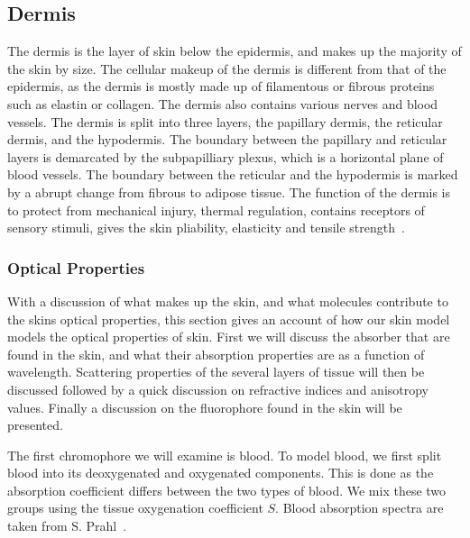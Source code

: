 \subsection*{Dermis} %
\label{sub:dermis}
The dermis is the layer of skin below the epidermis, and makes up the majority of the skin by size.
The cellular makeup of the dermis is different from that of the epidermis, as the dermis is mostly made up of filamentous or fibrous proteins such as elastin or collagen.
The dermis also contains various nerves and blood vessels.
The dermis is split into three layers, the papillary dermis, the reticular dermis, and the hypodermis.
The boundary between the papillary and reticular layers is demarcated by the subpapilliary plexus, which is a horizontal plane of blood vessels.
The boundary between the reticular and the hypodermis is marked by a abrupt change from fibrous to adipose tissue.
The function of the dermis is to protect from mechanical injury, thermal regulation, contains receptors of sensory stimuli, gives the skin pliability, elasticity and tensile strength~\cite{freedberg1999fitzpatrick,zaidi2010dermatology}.
 


\subsubsection*{Optical Properties} %
\label{sub:optical_properties}



With a discussion of what makes up the skin, and what molecules contribute to the skins optical properties, this section gives an account of how our skin model models the optical properties of skin.
First we will discuss the absorber that are found in the skin, and what their absorption properties are as a function of wavelength.
Scattering properties of the several layers of tissue will then be discussed followed by a quick discussion on refractive indices and anisotropy values.
Finally a discussion on the fluorophore found in the skin will be presented.


The first chromophore we will examine is blood.
To model blood, we first split blood into its deoxygenated and oxygenated components.
This is done as the absorption coefficient differs between the two types of blood. We mix these two groups using the tissue oxygenation coefficient $S$. Blood absorption spectra are taken from S. Prahl~\cite{prahlblood}.

